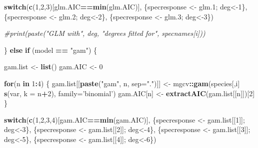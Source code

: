 \documentclass[]{article}
\newenvironment{Shaded}{\begin{snugshade}}{\end{snugshade}}
\newcommand{\CommentTok}[1]{\textcolor[rgb]{0.56,0.35,0.01}{\textit{#1}}}
\newcommand{\ControlFlowTok}[1]{\textcolor[rgb]{0.13,0.29,0.53}{\textbf{#1}}}
\newcommand{\DataTypeTok}[1]{\textcolor[rgb]{0.13,0.29,0.53}{#1}}
\newcommand{\DecValTok}[1]{\textcolor[rgb]{0.00,0.00,0.81}{#1}}
\newcommand{\FloatTok}[1]{\textcolor[rgb]{0.00,0.00,0.81}{#1}}
\newcommand{\KeywordTok}[1]{\textcolor[rgb]{0.13,0.29,0.53}{\textbf{#1}}}
\newcommand{\NormalTok}[1]{#1}
\newcommand{\OperatorTok}[1]{\textcolor[rgb]{0.81,0.36,0.00}{\textbf{#1}}}
\newcommand{\StringTok}[1]{\textcolor[rgb]{0.31,0.60,0.02}{#1}}
\begin{document}
\begin{Shaded}
\begin{Highlighting}[]
        \ControlFlowTok{switch}\NormalTok{(}\KeywordTok{c}\NormalTok{(}\DecValTok{1}\NormalTok{,}\DecValTok{2}\NormalTok{,}\DecValTok{3}\NormalTok{)[glm.AIC}\OperatorTok{==}\KeywordTok{min}\NormalTok{(glm.AIC)],}
\NormalTok{               \{specresponse <-}\StringTok{ }\NormalTok{glm}\FloatTok{.1}\NormalTok{; deg<-}\DecValTok{1}\NormalTok{\},}
\NormalTok{               \{specresponse <-}\StringTok{ }\NormalTok{glm}\FloatTok{.2}\NormalTok{; deg<-}\DecValTok{2}\NormalTok{\},}
\NormalTok{               \{specresponse <-}\StringTok{ }\NormalTok{glm}\FloatTok{.3}\NormalTok{; deg<-}\DecValTok{3}\NormalTok{\})}
        
        \CommentTok{#print(paste("GLM with", deg, "degrees fitted for", specnames[i]))}
        
\NormalTok{      \} }\ControlFlowTok{else} \ControlFlowTok{if}\NormalTok{ (model }\OperatorTok{==}\StringTok{ "gam"}\NormalTok{) \{}
        
\NormalTok{        gam.list <-}\StringTok{ }\KeywordTok{list}\NormalTok{()}
\NormalTok{        gam.AIC <-}\StringTok{ }\DecValTok{0}
        
        \ControlFlowTok{for}\NormalTok{(n }\ControlFlowTok{in} \DecValTok{1}\OperatorTok{:}\DecValTok{4}\NormalTok{) \{}
\NormalTok{          gam.list[[}\KeywordTok{paste}\NormalTok{(}\StringTok{"gam"}\NormalTok{, n, }\DataTypeTok{sep=}\StringTok{"."}\NormalTok{)]] <-}\StringTok{ }\NormalTok{mgcv}\OperatorTok{::}\KeywordTok{gam}\NormalTok{(species[,i] }\OperatorTok{~}\StringTok{ }\KeywordTok{s}\NormalTok{(var, }\DataTypeTok{k =}\NormalTok{ n}\OperatorTok{+}\DecValTok{2}\NormalTok{), }\DataTypeTok{family=}\StringTok{'binomial'}\NormalTok{)}
\NormalTok{          gam.AIC[n] <-}\StringTok{ }\KeywordTok{extractAIC}\NormalTok{(gam.list[[n]])[}\DecValTok{2}\NormalTok{]}
\NormalTok{        \}}
        
        \ControlFlowTok{switch}\NormalTok{(}\KeywordTok{c}\NormalTok{(}\DecValTok{1}\NormalTok{,}\DecValTok{2}\NormalTok{,}\DecValTok{3}\NormalTok{,}\DecValTok{4}\NormalTok{)[gam.AIC}\OperatorTok{==}\KeywordTok{min}\NormalTok{(gam.AIC)],}
\NormalTok{               \{specresponse <-}\StringTok{ }\NormalTok{gam.list[[}\DecValTok{1}\NormalTok{]]; deg<-}\DecValTok{3}\NormalTok{\},}
\NormalTok{               \{specresponse <-}\StringTok{ }\NormalTok{gam.list[[}\DecValTok{2}\NormalTok{]]; deg<-}\DecValTok{4}\NormalTok{\},}
\NormalTok{               \{specresponse <-}\StringTok{ }\NormalTok{gam.list[[}\DecValTok{3}\NormalTok{]]; deg<-}\DecValTok{5}\NormalTok{\},}
\NormalTok{               \{specresponse <-}\StringTok{ }\NormalTok{gam.list[[}\DecValTok{4}\NormalTok{]]; deg<-}\DecValTok{6}\NormalTok{\})}
        

\end{Highlighting}
\end{Shaded}
\end{document}
